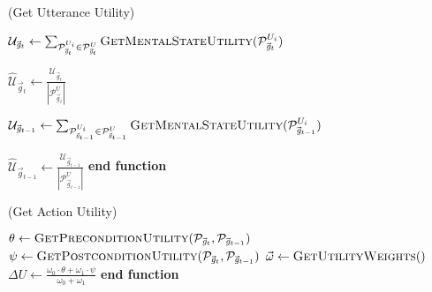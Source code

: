 \documentclass{article}
\begin{document}
\begin{algorithm}
	\caption{(Get Utterance Utility)}
	\label{array-sum}
	\begin{algorithmic}[1]
			\Statex
			\State $\mathcal{U}_{\vec{\mathit{g}}_{t}} \gets
			\sum\nolimits_{\mathcal{P}_{\vec{\mathit{g}}_{t}}^{U_i} \in
			\mathcal{P}_{\vec{\mathit{g}}_{t}}^{U}}
			\Call{GetMentalStateUtility}{\mathcal{P}_{\vec{\mathit{g}}_{t}}^{U_i}}$
			
			\State $\hat{\mathcal{U}}_{\vec{\mathit{g}}_{t}} \gets
			\frac{\mathcal{U}_{\vec{\mathit{g}}_{t}}}
			{\left|\mathcal{P}_{\vec{\mathit{g}}_{t}}^{U}\right|}$
			
			\State $\mathcal{U}_{\vec{\mathit{g}}_{t-1}} \gets
			\sum\nolimits_{\mathcal{P}_{\vec{\mathit{g}}_{t-1}}^{U_i} \in
			\mathcal{P}_{\vec{\mathit{g}}_{t-1}}^{U}}
			\Call{GetMentalStateUtility}{\mathcal{P}_{\vec{\mathit{g}}_{t-1}}^{U_i}}$
			
			\State $\hat{\mathcal{U}}_{\vec{\mathit{g}}_{t-1}} \gets
			\frac{\mathcal{U}_{\vec{\mathit{g}}_{t-1}}}
			{\left|\mathcal{P}_{\vec{\mathit{g}}_{t-1}}^{U}\right|}$
			\Statex
			\State {}
		\EndFunction
	\State \textbf{end function}
	\end{algorithmic}
\end{algorithm}

\begin{algorithm}
	\caption{(Get Action Utility)}
	\label{array-sum}
	\begin{algorithmic}[1]
			\Statex
			\State $\theta \gets
			\Call{GetPreconditionUtility}{\mathcal{P}_{\vec{\mathit{g}}_{t}},
			\mathcal{P}_{\vec{\mathit{g}}_{t-1}}}$
			\State $\psi \gets
			\Call{GetPostconditionUtility}{\mathcal{P}_{\vec{\mathit{g}}_{t}},
			\mathcal{P}_{\vec{\mathit{g}}_{t-1}}}$
			\Statex
			\State $\vec{\omega} \gets \Call{GetUtilityWeights}$
			\Statex
			\State $\Delta U \gets
			\frac{\omega_{0}\cdot \theta + \omega_{1}\cdot \psi}{\omega_{0} +
			\omega_{1}}$
			\Statex
			\State {} 
		\EndFunction 
	\State \textbf{end function}
	\end{algorithmic}
\end{algorithm}
\end{document}
